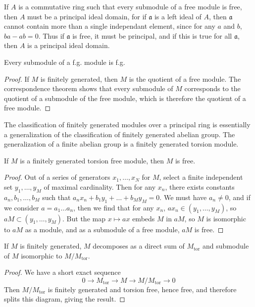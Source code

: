 If $A$ is a commutative ring such that every submodule of a free module is free, then $A$ must be a principal ideal domain, for if $\mathfrak{a}$ is a left ideal of $A$, then $\mathfrak{a}$ cannot contain more than a single independant element, since for any $a$ and $b$, $ba - ab = 0$. Thus if $\mathfrak{a}$ is free, it must be principal, and if this is true for all $\mathfrak{a}$, then $A$ is a principal ideal domain.

\begin{corollary}
    Every submodule of a f.g. module is f.g.
\end{corollary}
\begin{proof}
    If $M$ is finitely generated, then $M$ is the quotient of a free module. The correspondence theorem shows that every submodule of $M$ corresponds to the quotient of a submodule of the free module, which is therefore the quotient of a free module.
\end{proof}

The classification of finitely generated modules over a principal ring is essentially a generalization of the classification of finitely generated abelian group. The generalization of a finite abelian group is a finitely generated torsion module.

\begin{lemma}
    If $M$ is a finitely generated torsion free module, then $M$ is free.
\end{lemma}
\begin{proof}
    Out of a series of generators $x_1, \dots, x_N$ for $M$, select a finite independent set $y_1, \dots, y_M$ of maximal cardinality. Then for any $x_n$, there exists constants $a_n,b_1, \dots, b_M$ such that $a_nx_n + b_1y_1 + \dots + b_My_M = 0$. We must have $a_n \neq 0$, and if we consider $a = a_1 \dots a_n$, then we find that for any $x_n$, $ax_n \in (y_1, \dots, y_M)$, so $aM \subset (y_1, \dots, y_M)$. But the map $x \mapsto ax$ embeds $M$ in $aM$, so $M$ is isomorphic to $aM$ as a module, and as a submodule of a free module, $aM$ is free.
\end{proof}

\begin{theorem}
    If $M$ is finitely generated, $M$ decomposes as a direct sum of $M_{\text{tor}}$ and submodule of $M$ isomorphic to $M/M_{\text{tor}}$.
\end{theorem}
\begin{proof}
    We have a short exact sequence
    \[ 0 \to M_{\text{tor}} \to M \to M/M_{\text{tor}} \to 0 \]
    Then $M/M_{\text{tor}}$ is finitely generated and torsion free, hence free, and therefore splits this diagram, giving the result.
\end{proof}

